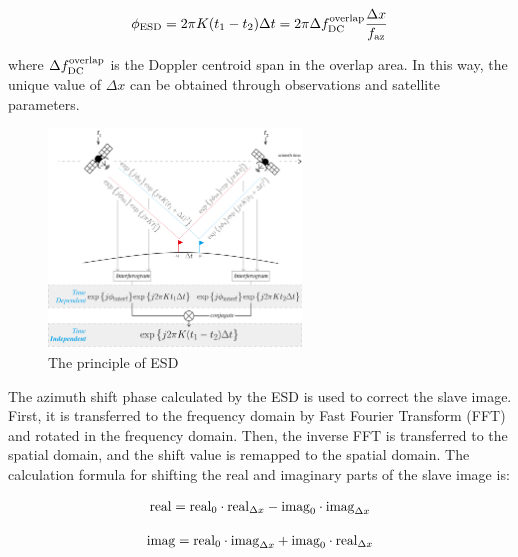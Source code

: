 \documentclass[a4paper,fleqn]{cas-sc}
\begin{document}
\begin{equation}
    \phi_{\rm ESD} = 2 \pi K (t_1 - t_2) \Delta t = 2 \pi \Delta f_{\rm DC}^{\rm overlap} \frac{\Delta x}{f_{\rm az}}
    \label{eq_3}
\end{equation}

\noindent where $\Delta f_{\rm DC}^{\rm overlap}$ is the Doppler centroid span in the overlap area. In this way, the unique value of $\Delta x$ can be obtained through observations and satellite parameters. \par

\begin{figure}
	\centering 
	\includegraphics[width=0.6\textwidth]{figure/The principle of ESD.png}	
	\caption{The principle of ESD} 
	\label{fig_2}%
\end{figure}

The azimuth shift phase calculated by the ESD is used to correct the slave image. First, it is transferred to the frequency domain by Fast Fourier Transform (FFT) and rotated in the frequency domain. Then, the inverse FFT is transferred to the spatial domain, and the shift value is remapped to the spatial domain. The calculation formula for shifting the real and imaginary parts of the slave image is: \par

\begin{equation}
    {\rm real} = {\rm real}_0 \cdot {\rm real}_{\Delta x} - {\rm imag}_0 \cdot {\rm imag}_{\Delta x}
    \label{eq_4}
\end{equation}

\begin{equation}
    {\rm imag} = {\rm real}_0 \cdot {\rm imag}_{\Delta x} + {\rm imag}_0 \cdot {\rm real}_{\Delta x}
    \label{eq_5}
\end{equation}
\end{document}
